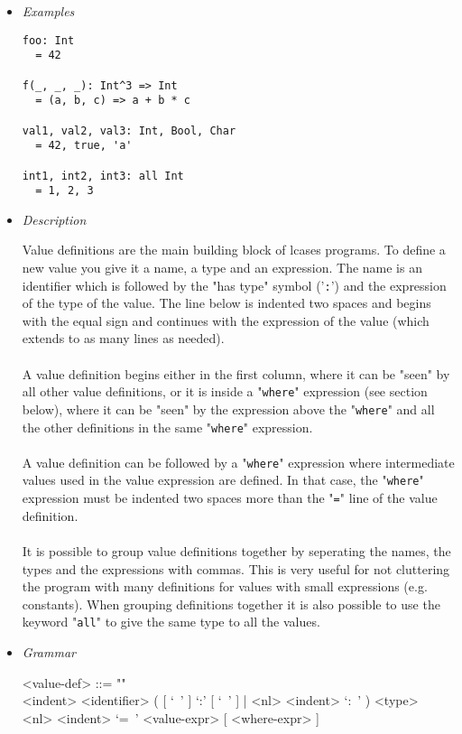 \documentclass{article}
\begin{document}
\begin{itemize}

\item \textit{Examples}

\begin{verbatim}
foo: Int
  = 42

f(_, _, _): Int^3 => Int
  = (a, b, c) => a + b * c

val1, val2, val3: Int, Bool, Char
  = 42, true, 'a'

int1, int2, int3: all Int
  = 1, 2, 3
\end{verbatim}

\item \textit{Description}

Value definitions are the main building block of lcases programs. To define a
new value you give it a name, a type and an expression. The name is an
identifier which is followed by the "has type" symbol ('\verb|:|') and the
expression of the type of the value. The line below is indented two spaces and
begins with the equal sign and continues with the expression of the value
(which extends to as many lines as needed).
\\\\
A value definition begins either in the first column, where it can be "seen" by
all other value definitions, or it is inside a "\verb|where|" expression (see
section below), where it can be "seen" by the expression above the
"\verb|where|" and all the other definitions in the same "\verb|where|"
expression.
\\\\
A value definition can be followed by a "\verb|where|" expression where
intermediate values used in the value expression are defined. In that case, the
"\verb|where|" expression must be indented two spaces more than the "\verb|=|"
line of the value definition.
\\\\
It is possible to group value definitions together by seperating the names, the
types and the expressions with commas. This is very useful for not cluttering
the program with many definitions for values with small expressions (e.g.
constants).  When grouping definitions together it is also possible to use the
keyword "\verb|all|" to give the same type to all the values.

\item \textit{Grammar}
\begin{grammar}
<value-def> ::= ""\\
<indent> <identifier>
( [ `\ ' ] `:' [ `\ ' ] | <nl> <indent> `:\ ' ) <type>  \\
<nl> <indent> `=\ ' <value-expr> [ <where-expr> ]


\end{grammar}
\end{itemize}
\end{document}

